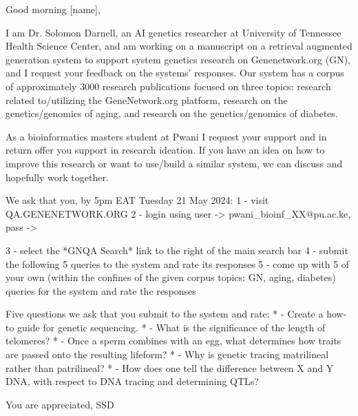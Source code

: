 Good morning [name],

I am Dr. Solomon Darnell, an AI genetics researcher at University of Tennessee Health Science Center, and am working on a manuscript on a retrieval augmented generation system to support system genetics research on Genenetwork.org (GN), and I request your feedback on the systems' responses.
Our system has a corpus of approximately 3000 research publications focused on three topics: research related to/utilizing the GeneNetwork.org platform, research on the genetics/genomics of aging, and research on the genetics/genomics of diabetes.

As a bioinformatics masters student at Pwani I request your support and in return offer you support in research ideation. If you have an idea on how to improve this research or want to use/build a similar system, we can discuss and hopefully work together.

We ask that you, by 5pm EAT Tuesday 21 May 2024:
1 - visit QA.GENENETWORK.ORG
2 - login using user -> pwani\_bioinf\_XX@pu.ac.ke, pass -> 

3 - select the *GNQA Search* link to the right of the main search bar
4 - submit the following 5 queries to the system and rate its responses
5 - come up with 5 of your own (within the confines of the given corpus topics: GN, aging, diabetes) queries for the system and rate the responses

Five questions we ask that you submit to the system and rate:
* - Create a how-to guide for genetic sequencing.
* - What is the significance of the length of telomeres?
* - Once a sperm combines with an egg, what determines how traits are passed onto the resulting lifeform?
* - Why is genetic tracing matrilineal rather than patrilineal?
* - How does one tell the difference between X and Y DNA, with respect to DNA tracing and determining QTLs?

You are appreciated,
SSD 